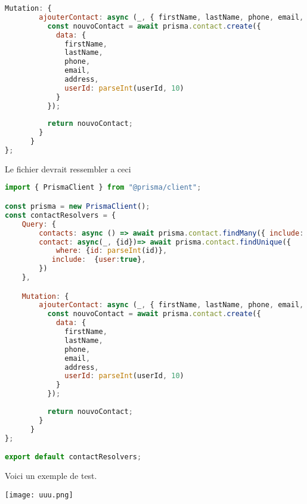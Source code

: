 \documentclass{article}
\begin{document}
\begin{lstlisting}[language=JavaScript]
   Mutation: {
        ajouterContact: async (_, { firstName, lastName, phone, email, address, userId }) => {
          const nouvoContact = await prisma.contact.create({
            data: {
              firstName,
              lastName,
              phone,
              email,
              address,
              userId: parseInt(userId, 10)
            }
          });
    
          return nouvoContact; 
        }
      }
};
\end{lstlisting}
Le fichier devrait ressembler a ceci 
\begin{lstlisting}[language=JavaScript]
import { PrismaClient } from "@prisma/client";

const prisma = new PrismaClient();
const contactResolvers = {
    Query: {
        contacts: async () => await prisma.contact.findMany({ include: { user: true } }),
        contact: async(_, {id})=> await prisma.contact.findUnique({
            where: {id: parseInt(id)},
           include:  {user:true},
        })
    },

    Mutation: {
        ajouterContact: async (_, { firstName, lastName, phone, email, address, userId }) => {
          const nouvoContact = await prisma.contact.create({
            data: {
              firstName,
              lastName,
              phone,
              email,
              address,
              userId: parseInt(userId, 10)
            }
          });
    
          return nouvoContact; 
        }
      }
};

export default contactResolvers;

\end{lstlisting}

Voici un exemple de test.

\begin{center} 
    \texttt{[image: uuu.png]} 
\end{center}
\end{document}
